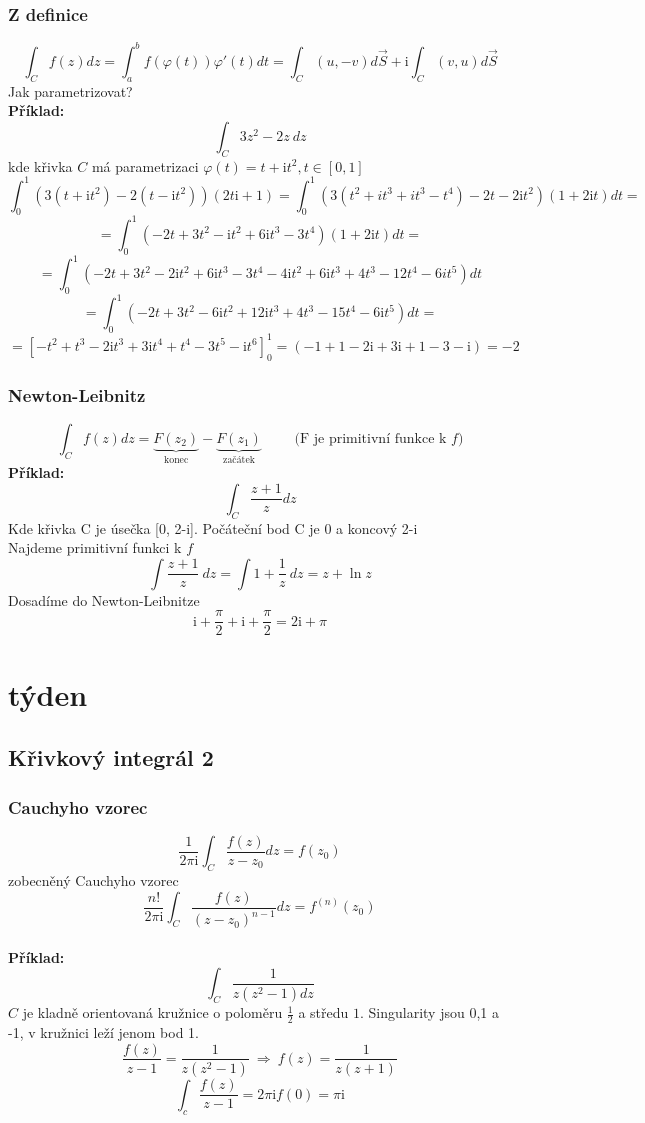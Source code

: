 \documentclass{article}
\newcommand{\mi}{\mathrm{i}}
\begin{document}
        \subsubsection{Z definice}
            \[\int_{C}f(z)dz=\int_{a}^{b}f(\varphi(t))\varphi'(t)dt=
            \int_C(u,-v)d\vec{S}+\mi\int_C(v,u)d\vec{S}\]
        Jak parametrizovat?
        \\
        {\bf Příklad:}
        \[\int_C3z^2-2z\:dz\]
        kde křivka $C$ má parametrizaci $\varphi(t)=t+\mi t^2, t\in[0,1]$
        \[\int_0^1(3(t+\mi t^2)-2(t-\mi t^2))(2t\mi+1)=
        \int_0^1(3(t^2+it^3+it^3-t^4)-2t-2\mi t^2)(1+2\mi t)dt=\]
        \[=\int_0^1(-2t+3t^2-\mi t^2+6\mi t^3-3t^4)(1+2\mi t)dt=\]
        \[=\int_0^1(-2t+3t^2-2\mi t^2+6\mi t^3-3t^4-4\mi t^2+6\mi t^3+4t^3-12t^4-6it^5)dt\]
        \[=\int_0^1(-2t+3t^2-6\mi t^2+12\mi t^3+4t^3-15t^4-6\mi t^5)dt=\]
        \[=\left[-t^2+t^3-2\mi t^3+3\mi t^4+t^4-3t^5-\mi t^6\right]_0^1=
        (-1+1-2\mi+3\mi+1-3-\mi)=-2\]
        \subsubsection{Newton-Leibnitz}
            \[\int_Cf(z)dz=\underbrace{F(z_2)}_{\mbox{konec}}
            -\underbrace{F(z_1)}_{\mbox{začátek}}\qquad\mbox{ (F je primitivní funkce k $f$)}\]
        {\bf Příklad:}
            \[\int_C\frac{z+1}{z}dz\]
            Kde křivka C je úsečka [0, 2-i]. Počáteční bod C je 0 a koncový 2-i
            \\
            Najdeme primitivní funkci k $f$
            \[\int\frac{z+1}{z}\:dz=\int 1+\frac{1}{z}\:dz=z+\ln z\]
            Dosadíme do Newton-Leibnitze
            \[\mi+\frac{\pi}{2}+\mi+\frac{\pi}{2}=2\mi +\pi\]
    \section{týden}%
        \subsection{Křivkový integrál 2}
        \subsubsection{Cauchyho vzorec}
            \[\frac{1}{2\pi\mi}\int_C\frac{f(z)}{z-z_0}dz=f(z_0)\]
        zobecněný Cauchyho vzorec
        \[\frac{n!}{2\pi\mi}\int_C\frac{f(z)}{(z-z_0)^{n-1}}dz=f^{(n)}(z_0)\]
        \\
        {\bf Příklad:}
        \[\label{eq1}\int_C\frac{1}{z(z^2-1)dz}\]
        $C$ je kladně orientovaná kružnice o poloměru $\frac{1}{2}$ a středu $1$.
        Singularity jsou 0,1 a -1, v kružnici leží jenom bod 1.
        \[\frac{f(z)}{z-1}=\frac{1}{z(z^2-1)}\:\Rightarrow\:f(z)=\frac{1}{z(z+1)}\]
        \[\int_c\frac{f(z)}{z-1}=2\pi\mi f(0)=\pi\mi\]
\end{document}
